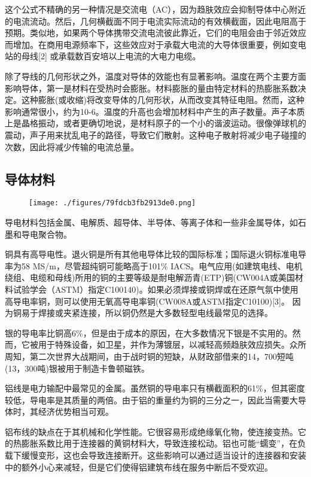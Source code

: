 这个公式不精确的另一种情况是交流电（AC），因为趋肤效应会抑制导体中心附近的电流流动。然后，几何横截面不同于电流实际流动的有效横截面，因此电阻高于预期。类似地，如果两个导体携带交流电流彼此靠近，它们的电阻会由于邻近效应而增加。在商用电源频率下，这些效应对于承载大电流的大导体很重要，例如变电站的母线[2] 或承载数百安培以上电流的大电力电缆。

除了导线的几何形状之外，温度对导体的效能也有显著影响。温度在两个主要方面影响导体，第一是材料在受热时会膨胀。材料膨胀的量由特定材料的热膨胀系数决定。这种膨胀(或收缩)将改变导体的几何形状，从而改变其特征电阻。然而，这种影响通常很小，约为10-6。温度的升高也会增加材料中产生的声子数量。声子本质上是晶格振动，或者更确切地说，是材料原子的一个小的谐波运动。很像弹球机的震动，声子用来扰乱电子的路径，导致它们散射。这种电子散射将减少电子碰撞的次数，因此将减少传输的电流总量。

\subsection{导体材料}
\begin{figure}[ht]
\centering
\texttt{[image: ./figures/79fdcb3fb2913de0.png]}
\caption\label{fig_DDT_2}
\end{figure}

导电材料包括金属、电解质、超导体、半导体、等离子体和一些非金属导体，如石墨和导电聚合物。

铜具有高导电性。退火铜是所有其他电导体比较的国际标准；国际退火铜标准电导率为58 MS/m，尽管超纯铜可能略高于101\% IACS。电气应用(如建筑电线、电机绕组、电缆和母线)所用的铜的主要等级是耐电解沥青(ETP)铜(CW004A或美国材料试验学会（ASTM）指定C100140)。如果必须焊接或铜焊或在还原气氛中使用高导电率铜，则可以使用无氧高导电率铜(CW008A或ASTM指定C10100)[3]。 因为铜易于焊接或夹紧连接，所以铜仍然是大多数轻型电线最常见的选择。

银的导电率比铜高6\%，但是由于成本的原因，在大多数情况下银是不实用的。然而，它被用于特殊设备，如卫星，并作为薄镀层，以减轻高频趋肤效应损失。众所周知，第二次世界大战期间，由于战时铜的短缺，从财政部借来的14，700短吨(13，300吨)银被用于制造卡鲁顿磁铁。

铝线是电力输配中最常见的金属。虽然铜的导电率只有横截面积的61\%，但其密度较低，导电率是其质量的两倍。由于铝的重量约为铜的三分之一，因此当需要大导体时，其经济优势相当可观。

铝布线的缺点在于其机械和化学性能。它很容易形成绝缘氧化物，使连接变热。它的热膨胀系数比用于连接器的黄铜材料大，导致连接松动。铝也可能“蠕变”，在负载下缓慢变形，这也会导致连接断开。这些影响可以通过适当设计的连接器和安装中的额外小心来减轻，但是它们使得铝建筑布线在服务中断后不受欢迎。

